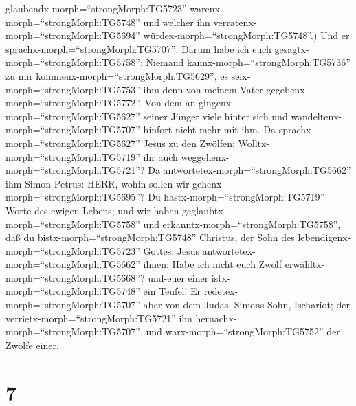glaubendx-morph=``strongMorph:TG5723''
warenx-morph=``strongMorph:TG5748'' und welcher ihn
verratenx-morph=``strongMorph:TG5694''
würdex-morph=``strongMorph:TG5748''.)  Und er
sprachx-morph=``strongMorph:TG5707'': Darum habe ich euch
gesagtx-morph=``strongMorph:TG5758'': Niemand
kannx-morph=``strongMorph:TG5736'' zu mir
kommenx-morph=``strongMorph:TG5629'', es
seix-morph=``strongMorph:TG5753'' ihm denn von meinem Vater
gegebenx-morph=``strongMorph:TG5772''.  Von dem an
gingenx-morph=``strongMorph:TG5627'' seiner Jünger viele hinter sich und
wandeltenx-morph=``strongMorph:TG5707'' hinfort nicht mehr mit ihm.
 Da sprachx-morph=``strongMorph:TG5627'' Jesus zu den
Zwölfen: Wolltx-morph=``strongMorph:TG5719'' ihr auch
weggehenx-morph=``strongMorph:TG5721''?  Da
antwortetex-morph=``strongMorph:TG5662'' ihm Simon Petrus: HERR, wohin
sollen wir gehenx-morph=``strongMorph:TG5695''? Du
hastx-morph=``strongMorph:TG5719'' Worte des ewigen Lebens;
 und wir haben geglaubtx-morph=``strongMorph:TG5758'' und
erkanntx-morph=``strongMorph:TG5758'', daß du
bistx-morph=``strongMorph:TG5748'' Christus, der Sohn des
lebendigenx-morph=``strongMorph:TG5723'' Gottes.  Jesus
antwortetex-morph=``strongMorph:TG5662'' ihnen: Habe ich nicht euch
Zwölf erwähltx-morph=``strongMorph:TG5668''? und-euer einer
istx-morph=``strongMorph:TG5748'' ein Teufel!  Er
redetex-morph=``strongMorph:TG5707'' aber von dem Judas, Simons Sohn,
Ischariot; der verrietx-morph=``strongMorph:TG5721'' ihn
hernachx-morph=``strongMorph:TG5707'', und
warx-morph=``strongMorph:TG5752'' der Zwölfe einer.

\hypertarget{section-6}{%
\section{7}\label{section-6}}


